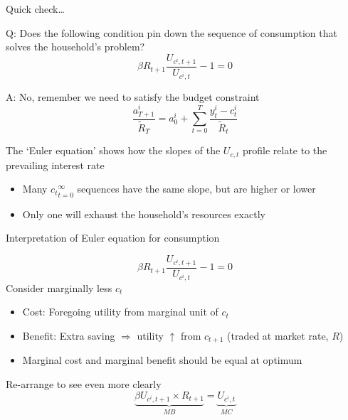 
\begin{frame}{Quick check\ldots}

Q: Does the following condition pin down the sequence of consumption that solves the household's problem?
\begin{equation*}
\beta R_{t+1}\frac{U_{c^{i},t+1}}{U_{c^{i},t}}-1=0
\end{equation*}

A: No, remember we need to satisfy the budget constraint
\begin{equation*}
\frac{a_{T+1}^{i}}{\tilde{R}_{T}}=a_{0}^{i}+\sum\limits_{t=0}^{T}\frac{y_{t}^{i}-c_{t}^{i}}{\tilde{R}_{t}}
\end{equation*}

The `Euler equation' shows how the slopes of the $U_{c,t}$ profile relate to the prevailing interest rate
	\begin{itemize}
	\item	Many ${c_{t}}_{t=0}^{\infty}$ sequences have the same slope, but are higher or lower
	\item	Only one will exhaust the household's resources exactly
	\end{itemize}
	
\end{frame}


\begin{frame}{Interpretation of Euler equation for consumption}

\begin{equation*}
\beta R_{t+1}\frac{U_{c^{i},t+1}}{U_{c^{i},t}}-1=0
\end{equation*}
Consider marginally less $c_{t}$
\begin{itemize}
\item	Cost: Foregoing utility from marginal unit of $c_{t}$
\item	Benefit: Extra saving $\Rightarrow$ utility $\uparrow$ from $c_{t+1}$ (traded at market rate, $R$)
\item	Marginal cost and marginal benefit should be equal at optimum
\end{itemize}

\vspace{3mm}
Re-arrange to see even more clearly
\begin{equation*}
\underbrace{\beta U_{c^{i},t+1} \times R_{t+1}}_{MB}=\underbrace{U_{c^{i},t}}_{MC}
\end{equation*}

\end{frame}

